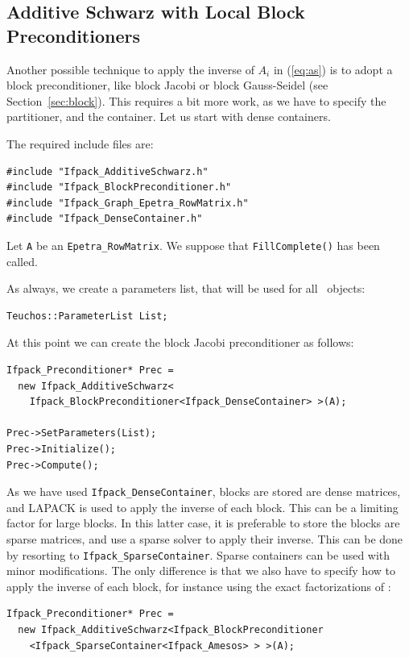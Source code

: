 {\subsection{Additive Schwarz with Local Block Preconditioners}
\label{sec:as_b_ov}

Another possible technique to apply the inverse of $A_i$ in (\ref{eq:as})
is to adopt a block preconditioner, like block Jacobi 
or block Gauss-Seidel (see
Section~\ref{sec:block}). This requires a
bit more work, as we have to specify the partitioner, and the container. Let
us start with dense containers.

The required include files are:
\begin{verbatim}
#include "Ifpack_AdditiveSchwarz.h"
#include "Ifpack_BlockPreconditioner.h"
#include "Ifpack_Graph_Epetra_RowMatrix.h"
#include "Ifpack_DenseContainer.h"
\end{verbatim}

Let \verb!A! be an \verb!Epetra_RowMatrix!. We suppose that
\verb!FillComplete()! has been called. 

As always, we create a parameters list, that will be used
for all \ifpack\ objects:
\begin{verbatim}
Teuchos::ParameterList List;
\end{verbatim}
At this point we can create the block Jacobi preconditioner as follows:
\begin{verbatim}
Ifpack_Preconditioner* Prec = 
  new Ifpack_AdditiveSchwarz<
    Ifpack_BlockPreconditioner<Ifpack_DenseContainer> >(A);

Prec->SetParameters(List);
Prec->Initialize();
Prec->Compute();
\end{verbatim}
As we have used {\tt Ifpack\_DenseContainer}, blocks are stored are dense
matrices, and LAPACK is used to apply the inverse of each block. This can be a
limiting factor for large blocks. In this latter case, it is preferable to
store the blocks are sparse matrices, and use a sparse solver to apply their
inverse. This can be done by resorting to {\tt Ifpack\_SparseContainer}. 
Sparse containers can be used with minor modifications. The only difference is
that we also have to specify how to apply the inverse of each block, for
instance using the exact factorizations of \amesos:
\begin{verbatim}
Ifpack_Preconditioner* Prec = 
  new Ifpack_AdditiveSchwarz<Ifpack_BlockPreconditioner
    <Ifpack_SparseContainer<Ifpack_Amesos> > >(A);
\end{verbatim}

}
